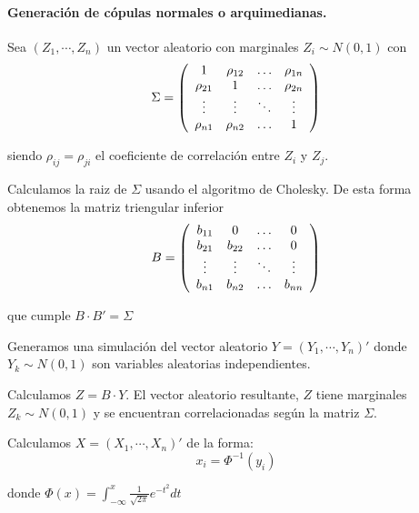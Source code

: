 \paragraph{Generaci\'on de c\'opulas normales o arquimedianas.}

Sea $(Z_1,\cdots, Z_n)$ un vector aleatorio con marginales $Z_i \sim N(0,1)$ con
\begin{displaymath}
\Sigma = \left( 
\begin{array}{cccc}
1          & \rho_{12} & \ldots & \rho_{1n} \cr
\rho_{21} & 1          & \ldots & \rho_{2n} \cr
\vdots    & \vdots    & \ddots & \vdots   \cr
\rho_{n1} & \rho_{n2} & \ldots & 1
\end{array}
\right)
\end{displaymath}

\noindent siendo $\rho_{ij} = \rho_{ji}$ el coeficiente de correlaci\'on entre 
$Z_i$ y $Z_j$.

\noindent Calculamos la raiz de $\Sigma$ usando el algoritmo de Cholesky. 
De esta forma obtenemos la matriz triengular inferior
\begin{displaymath}
B = 
\left(
\begin{array}{cccc}
b_{11}   & 0        & \ldots & 0       \cr
b_{21}   & b_{22}   & \ldots & 0       \cr
\vdots  & \vdots  & \ddots & \vdots \cr
b_{n1}   & b_{n2}   & \ldots & b_{nn}
\end{array}
\right)
\end{displaymath}

\noindent que cumple $B \cdot B' = \Sigma$

\noindent Generamos una simulaci\'on del vector aleatorio $Y=(Y_1, \cdots, Y_n)'$ 
donde $Y_k \sim N(0,1)$ son variables aleatorias independientes.

\noindent Calculamos $Z = B \cdot Y$. El vector aleatorio resultante, $Z$ tiene
marginales $Z_k \sim N(0,1)$ y se encuentran correlacionadas seg\'un la matriz 
$\Sigma$.

\noindent Calculamos $X = (X_1, \cdots, X_n)'$ de la forma:
\begin{displaymath}
x_i = \Phi^{-1}(y_i)
\end{displaymath}

\noindent donde $\Phi(x) = \int_{-\infty}^{x} \frac{1}{\sqrt{2 \pi}} e^{-t^2} dt$

